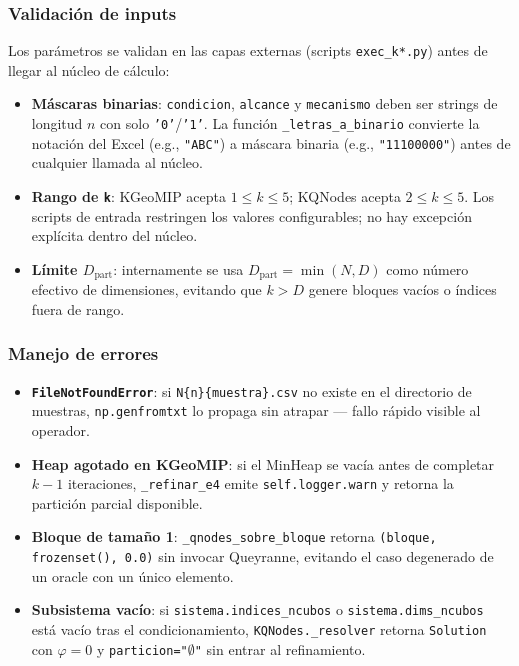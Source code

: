 \subsubsection*{Validación de inputs}

Los parámetros se validan en las capas externas (scripts \texttt{exec\_k*.py})
antes de llegar al núcleo de cálculo:

\begin{itemize}
  \item \textbf{Máscaras binarias}: \texttt{condicion}, \texttt{alcance} y
        \texttt{mecanismo} deben ser strings de longitud $n$ con solo
        \texttt{'0'}/\texttt{'1'}. La función \texttt{\_letras\_a\_binario}
        convierte la notación del Excel (e.g., \texttt{"ABC"}) a máscara binaria
        (e.g., \texttt{"11100000"}) antes de cualquier llamada al núcleo.

  \item \textbf{Rango de \texttt{k}}: KGeoMIP acepta $1 \le k \le 5$;
        KQNodes acepta $2 \le k \le 5$. Los scripts de entrada restringen los
        valores configurables; no hay excepción explícita dentro del núcleo.

  \item \textbf{Límite $D_{\text{part}}$}: internamente se usa
        $D_{\text{part}} = \min(N, D)$ como número efectivo de dimensiones,
        evitando que $k > D$ genere bloques vacíos o índices fuera de rango.
\end{itemize}

\subsubsection*{Manejo de errores}

\begin{itemize}
  \item \textbf{\texttt{FileNotFoundError}}: si \texttt{N\{n\}\{muestra\}.csv}
        no existe en el directorio de muestras, \texttt{np.genfromtxt} lo
        propaga sin atrapar — fallo rápido visible al operador.

  \item \textbf{Heap agotado en KGeoMIP}: si el MinHeap se vacía antes de
        completar $k-1$ iteraciones, \texttt{\_refinar\_e4} emite
        \texttt{self.logger.warn} y retorna la partición parcial disponible.

  \item \textbf{Bloque de tamaño 1}: \texttt{\_qnodes\_sobre\_bloque} retorna
        \texttt{(bloque, frozenset(), 0.0)} sin invocar Queyranne, evitando
        el caso degenerado de un oracle con un único elemento.

  \item \textbf{Subsistema vacío}: si \texttt{sistema.indices\_ncubos} o
        \texttt{sistema.dims\_ncubos} está vacío tras el condicionamiento,
        \texttt{KQNodes.\_resolver} retorna \texttt{Solution} con $\varphi=0$
        y \texttt{particion="$\emptyset$"} sin entrar al refinamiento.
\end{itemize}

